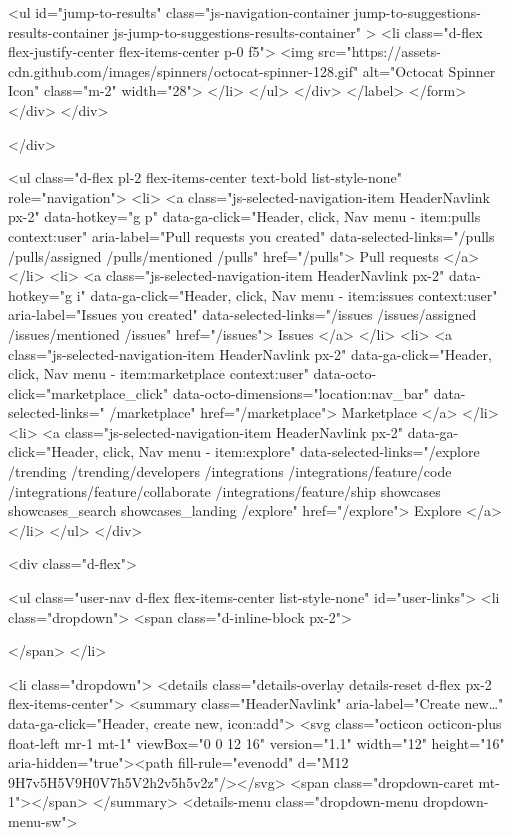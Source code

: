               <ul id="jump-to-results" class="js-navigation-container jump-to-suggestions-results-container js-jump-to-suggestions-results-container" >
                <li class="d-flex flex-justify-center flex-items-center p-0 f5">
                  <img src="https://assets-cdn.github.com/images/spinners/octocat-spinner-128.gif" alt="Octocat Spinner Icon" class="m-2" width="28">
                </li>
              </ul>
            </div>
      </label>
</form>  </div>
</div>

            </div>

          <ul class="d-flex pl-2 flex-items-center text-bold list-style-none" role="navigation">
            <li>
              <a class="js-selected-navigation-item HeaderNavlink px-2" data-hotkey="g p" data-ga-click="Header, click, Nav menu - item:pulls context:user" aria-label="Pull requests you created" data-selected-links="/pulls /pulls/assigned /pulls/mentioned /pulls" href="/pulls">
                Pull requests
</a>            </li>
            <li>
              <a class="js-selected-navigation-item HeaderNavlink px-2" data-hotkey="g i" data-ga-click="Header, click, Nav menu - item:issues context:user" aria-label="Issues you created" data-selected-links="/issues /issues/assigned /issues/mentioned /issues" href="/issues">
                Issues
</a>            </li>
              <li>
                <a class="js-selected-navigation-item HeaderNavlink px-2" data-ga-click="Header, click, Nav menu - item:marketplace context:user" data-octo-click="marketplace_click" data-octo-dimensions="location:nav_bar" data-selected-links=" /marketplace" href="/marketplace">
                   Marketplace
</a>              </li>
            <li>
              <a class="js-selected-navigation-item HeaderNavlink px-2" data-ga-click="Header, click, Nav menu - item:explore" data-selected-links="/explore /trending /trending/developers /integrations /integrations/feature/code /integrations/feature/collaborate /integrations/feature/ship showcases showcases_search showcases_landing /explore" href="/explore">
                Explore
</a>            </li>
          </ul>
      </div>

      <div class="d-flex">
        
<ul class="user-nav d-flex flex-items-center list-style-none" id="user-links">
  <li class="dropdown">
    <span class="d-inline-block  px-2">
      

    </span>
  </li>

  <li class="dropdown">
    <details class="details-overlay details-reset d-flex px-2 flex-items-center">
      <summary class="HeaderNavlink"
         aria-label="Create new…"
         data-ga-click="Header, create new, icon:add">
        <svg class="octicon octicon-plus float-left mr-1 mt-1" viewBox="0 0 12 16" version="1.1" width="12" height="16" aria-hidden="true"><path fill-rule="evenodd" d="M12 9H7v5H5V9H0V7h5V2h2v5h5v2z"/></svg>
        <span class="dropdown-caret mt-1"></span>
      </summary>
      <details-menu class="dropdown-menu dropdown-menu-sw">
        

